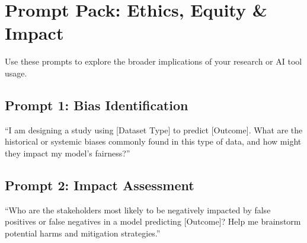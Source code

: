 \documentclass[
]{report}
\author{}
\date{}
\renewcommand*\contentsname{Table of contents}
\newcommand\contentsname{Table of contents}
\begin{document}
\renewcommand*\contentsname{Table of contents}
{
\hypersetup{linkcolor=}
\setcounter{tocdepth}{2}
\tableofcontents
}

\chapter{Prompt Pack: Ethics, Equity \&
Impact}\label{prompt-pack-ethics-equity-impact}

Use these prompts to explore the broader implications of your research
or AI tool usage.

\section{Prompt 1: Bias
Identification}\label{prompt-1-bias-identification}

``I am designing a study using {[}Dataset Type{]} to predict
{[}Outcome{]}. What are the historical or systemic biases commonly found
in this type of data, and how might they impact my model's fairness?''

\section{Prompt 2: Impact Assessment}\label{prompt-2-impact-assessment}

``Who are the stakeholders most likely to be negatively impacted by
false positives or false negatives in a model predicting {[}Outcome{]}?
Help me brainstorm potential harms and mitigation strategies.''
\end{document}
